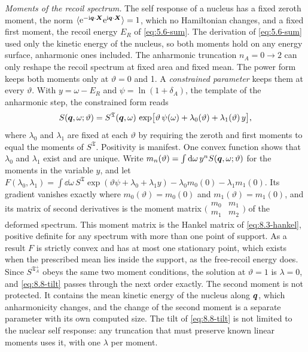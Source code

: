 \emph{Moments of the recoil spectrum.} The self response of a nucleus has a fixed zeroth moment, the norm $\langle\mathrm{e}^{-\mathrm{i}\bm{q}\cdot\bm{X}}\mathrm{e}^{\mathrm{i}\bm{q}\cdot\bm{X}}\rangle = 1$, which no Hamiltonian changes, and a fixed first moment, the recoil energy $E_R$ of \cref{eq:5.6-sum}. The derivation of \cref{eq:5.6-sum} used only the kinetic energy of the nucleus, so both moments hold on any energy surface, anharmonic ones included. The anharmonic truncation $n_A = 0 \to 2$ can only reshape the recoil spectrum at fixed area and fixed mean. The power form keeps both moments only at $\vartheta = 0$ and 1. A \emph{constrained parameter} keeps them at every $\vartheta$. With $y = \omega - E_R$ and $\psi = \ln(1 + \delta_A)$, the template of the anharmonic step, the constrained form reads
\begin{equation}
  S(\bm{q},\omega;\vartheta) = S^{\mathfrak{T}}(\bm{q},\omega)\,\exp\bigl[\vartheta\,\psi(\omega) + \lambda_0(\vartheta) + \lambda_1(\vartheta)\,y\bigr] ,
  \label{eq:8.8-tilt}
\end{equation}
where $\lambda_0$ and $\lambda_1$ are fixed at each $\vartheta$ by requiring the zeroth and first moments to equal the moments of $S^{\mathfrak{T}}$. Positivity is manifest. One convex function shows that $\lambda_0$ and $\lambda_1$ exist and are unique. Write $m_n(\vartheta) = \int\mathrm{d}\omega\,y^nS(\bm{q},\omega;\vartheta)$ for the moments in the variable $y$, and let $F(\lambda_0,\lambda_1) = \int\dd\omega\,S^{\mathfrak{T}}\exp(\vartheta\psi + \lambda_0 + \lambda_1y) - \lambda_0m_0(0) - \lambda_1m_1(0)$. Its gradient vanishes exactly where $m_0(\vartheta) = m_0(0)$ and $m_1(\vartheta) = m_1(0)$, and its matrix of second derivatives is the moment matrix $\bigl(\begin{smallmatrix}m_0 & m_1\\ m_1 & m_2\end{smallmatrix}\bigr)$ of the deformed spectrum. This moment matrix is the Hankel matrix of \cref{eq:8.3-hankel}, positive definite for any spectrum with more than one point of support. As a result $F$ is strictly convex and has at most one stationary point, which exists when the prescribed mean lies inside the support, as the free-recoil energy does. Since $S^{\mathfrak{T}_A^+}$ obeys the same two moment conditions, the solution at $\vartheta = 1$ is $\lambda = 0$, and \cref{eq:8.8-tilt} passes through the next order exactly. The second moment is not protected. It contains the mean kinetic energy of the nucleus along $\bm{q}$, which anharmonicity changes, and the change of the second moment is a separate parameter with its own computed size. The tilt of \cref{eq:8.8-tilt} is not limited to the nuclear self response: any truncation that must preserve known linear moments uses it, with one $\lambda$ per moment.

